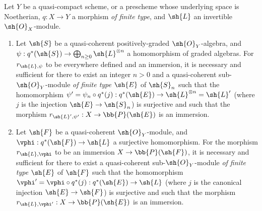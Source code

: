 \begin{proposition}[4.4.1]
\label{II.4.4.1}
Let $Y$ be a quasi-compact scheme, or a prescheme whose underlying space is Noetherian, $q:X\to Y$ a morphism \emph{of finite type}, and $\sh{L}$ an invertible $\sh{O}_X$-module.
\begin{enumerate}
  \item[\rm{(i)}] Let $\sh{S}$ be a quasi-coherent positively-graded $\sh{O}_Y$-algebra, and $\psi:q^*(\sh{S})\to\bigoplus_{n\geq0}\sh{L}^{\otimes n}$ a homomorphism of graded algebras.
    For $r_{\sh{L},\psi}$ to be everywhere defined and an immersion, it is necessary and
    sufficient for there to exist an integer $n>0$ and a quasi-coherent sub-$\sh{O}_Y$-module \emph{of finite type} $\sh{E}$ of $\sh{S}_n$ such that the homomorphism $\psi'=\psi_n\circ q^*(j):q^*(\sh{E})\to\sh{L}^{\otimes n}=\sh{L}'$ (where $j$ is the injection $\sh{E}\to\sh{S}_n$) is surjective and such that the morphism $r_{\sh{L}',\psi'}:X\to\bb{P}(\sh{E})$ is an immersion.
  \item[\rm{(ii)}] Let $\sh{F}$ be a quasi-coherent $\sh{O}_Y$-module, and $\vphi:q^*(\sh{F})\to\sh{L}$ a surjective homomorphism.
    For the morphism $r_{\sh{L},\vphi}$ to be an immersion $X\to\bb{P}(\sh{F})$, it is necessary and sufficient for there to exist a quasi-coherent sub-$\sh{O}_Y$-module \emph{of finite type} $\sh{E}$ of $\sh{F}$ such that the homomorphism $\vphi'=\vphi\circ q^*(j):q^*(\sh{E})\to\sh{L}$ (where $j$ is the canonical injection $\sh{E}\to\sh{F}$) is surjective and such that the morphism $r_{\sh{L},\vphi'}:X\to\bb{P}(\sh{E})$ is an immersion.
\end{enumerate}
\end{proposition}

